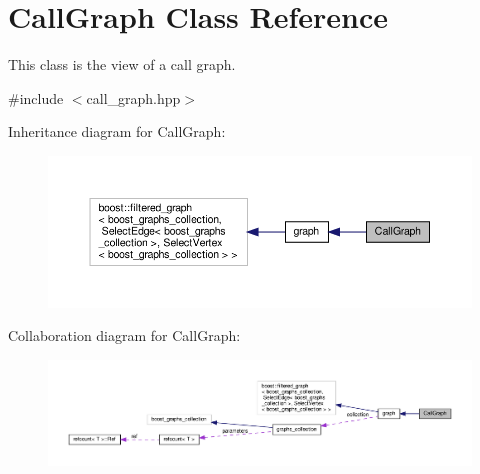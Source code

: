 \hypertarget{classCallGraph}{}\section{Call\+Graph Class Reference}
\label{classCallGraph}


This class is the view of a call graph.  




{\ttfamily \#include $<$call\+\_\+graph.\+hpp$>$}



Inheritance diagram for Call\+Graph\+:
\nopagebreak
\begin{figure}[H]
\begin{center}
\leavevmode
\includegraphics[width=350pt]{d8/df5/classCallGraph__inherit__graph}
\end{center}
\end{figure}


Collaboration diagram for Call\+Graph\+:
\nopagebreak
\begin{figure}[H]
\begin{center}
\leavevmode
\includegraphics[width=350pt]{d8/d2d/classCallGraph__coll__graph}
\end{center}
\end{figure}
